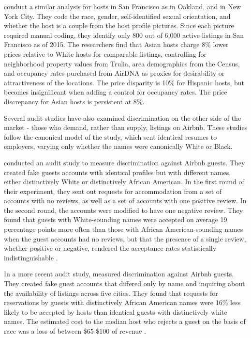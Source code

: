 \cite{kakar} conduct a similar analysis for hosts in San Francisco as \cite{wang} in Oakland, and \cite{edelman} in New York City. They code the race, gender, self-identified sexual orientation, and whether the host is a couple from the host profile pictures. Since each picture required manual coding, they identify only 800 out of 6,000 active listings in San Francisco as of 2015. The researchers find that Asian hosts charge 8\% lower prices relative to White hosts for comparable listings, controlling for neighborhood property values from Trulia, area demographics from the Census, and occupancy rates purchased from AirDNA as proxies for desirability or attractiveness of the locations. The price disparity is 10\% for Hispanic hosts, but becomes insignificant when adding a control for occupancy rates. The price discrepancy for Asian hosts is persistent at 8\%. 

Several audit studies have also examined discrimination on the other side of the market - those who demand, rather than supply, listings on Airbnb. These studies follow the canonical model of the \cite{bertrand} study, which sent identical resumes to employers, varying only whether the names were canonically White or Black. 

\cite{cui} conducted an audit study to measure discrimination against Airbnb guests. They created fake guests accounts with identical profiles but with different names, either distinctively White or distinctively African American. In the first round of their experiment, they sent out requests for accommodation from a set of accounts with no reviews, as well as a set of accounts with one positive review. In the second round, the accounts were modified to have one negative review. They found that guests with White-sounding names were accepted on average 19 percentage points more often than those with African American-sounding names when the guest accounts had no reviews, but that the presence of a single review, whether positive or negative, rendered the acceptance rates statistically indistinguishable \citep{cui}.

In a more recent audit study, \cite{edelman2} measured discrimination against Airbnb guests. They created fake guest accounts that differed only by name and inquiring about the availability of listings across five cities. They found that requests for reservations by guests with distinctively African American names were 16\% less likely to be accepted by hosts than identical guests with distinctively white names. The estimated cost to the median host who rejects a guest on the basis of race was a loss of between \$65-\$100 of revenue \citep{edelman2}.

